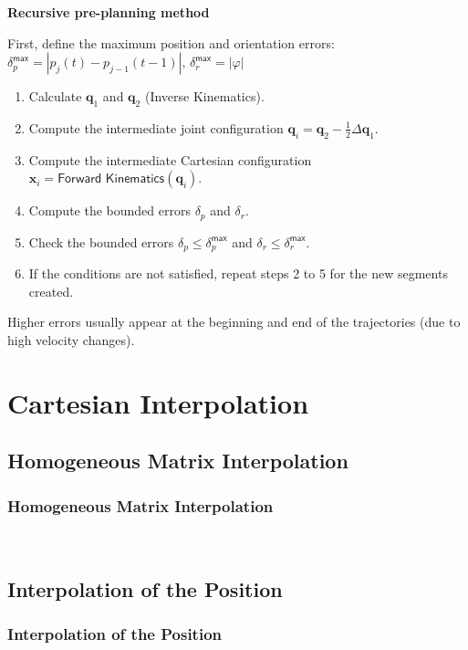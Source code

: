 \documentclass[10pt, aspectratio=169]{beamer}
\theoremstyle{remark}
\theoremstyle{definition}
\begin{document}
\begin{frame}[allowframebreaks]
    \framebreak

    \textbf{\textcolor{uma_blue_dark}{Recursive pre-planning method}}

    First, define the maximum position and orientation errors:
    $
    \delta_p^{\textsf{max}} = |p_j(t)-p_{j-1}(t-1)|, \, \delta_r^{\textsf{max}} = |\varphi|
    $
    \begin{enumerate}
        \item Calculate $\mathbf{q}_1$ and $\mathbf{q}_2$ (Inverse Kinematics).
        \item Compute the intermediate joint configuration $\mathbf{q}_i = \mathbf{q}_2-\frac{1}{2}\Delta\mathbf{q}_1$.
        \item Compute the intermediate Cartesian configuration $\mathbf{x}_i = \textsf{Forward Kinematics}(\mathbf{q}_i)$.
        \item Compute the bounded errors $\delta_p$ and $\delta_r$.
        \item Check the bounded errors $\delta_p \leq \delta_p^{\textsf{max}} $ and $\delta_r \leq \delta_r^{\textsf{max}}$.
        \item If the conditions are not satisfied, repeat steps 2 to 5 for the new segments created.
    \end{enumerate}

    Higher errors usually appear at the beginning and end of the trajectories (due to high velocity changes).
    


\end{frame}

\section{Cartesian Interpolation}
\subsection{Homogeneous Matrix Interpolation}
\begin{frame}[allowframebreaks]
\frametitle{Homogeneous Matrix Interpolation}

~\cite{paul1979manipulator}

\end{frame}

\subsection{Interpolation of the Position}
\begin{frame}[allowframebreaks]
\frametitle{Interpolation of the Position}


\end{frame}
\end{document}
